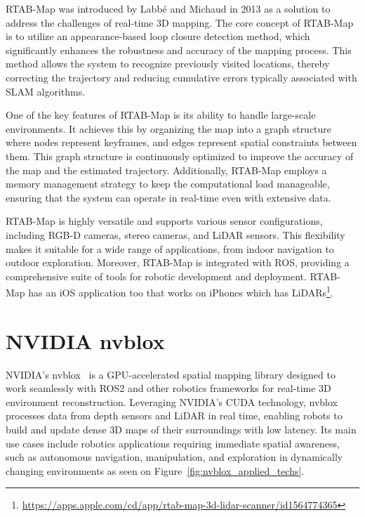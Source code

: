 RTAB-Map was introduced by Labbé and Michaud in 2013 as a solution to address the challenges of real-time 3D mapping. The core concept of RTAB-Map is to utilize an appearance-based loop closure detection method, which significantly enhances the robustness and accuracy of the mapping process. This method allows the system to recognize previously visited locations, thereby correcting the trajectory and reducing cumulative errors typically associated with SLAM algorithms.

One of the key features of RTAB-Map is its ability to handle large-scale environments. It achieves this by organizing the map into a graph structure where nodes represent keyframes, and edges represent spatial constraints between them. This graph structure is continuously optimized to improve the accuracy of the map and the estimated trajectory. Additionally, RTAB-Map employs a memory management strategy to keep the computational load manageable, ensuring that the system can operate in real-time even with extensive data.

RTAB-Map is highly versatile and supports various sensor configurations, including RGB-D cameras, stereo cameras, and LiDAR sensors. This flexibility makes it suitable for a wide range of applications, from indoor navigation to outdoor exploration. Moreover, RTAB-Map is integrated with ROS, providing a comprehensive suite of tools for robotic development and deployment. RTAB-Map has an iOS application too that works on iPhones which has LiDARs\footnote{\url{https://apps.apple.com/cd/app/rtab-map-3d-lidar-scanner/id1564774365}}.

\section{NVIDIA nvblox}

NVIDIA’s nvblox~\cite{nvblox_docs} is a GPU-accelerated spatial mapping library designed to work seamlessly with ROS2 and other robotics frameworks for real-time 3D environment reconstruction. Leveraging NVIDIA’s CUDA technology, nvblox processes data from depth sensors and LiDAR in real time, enabling robots to build and update dense 3D maps of their surroundings with low latency. Its main use cases include robotics applications requiring immediate spatial awareness, such as autonomous navigation, manipulation, and exploration in dynamically changing environments as seen on Figure~\ref{fig:nvblox_applied_techs}.

